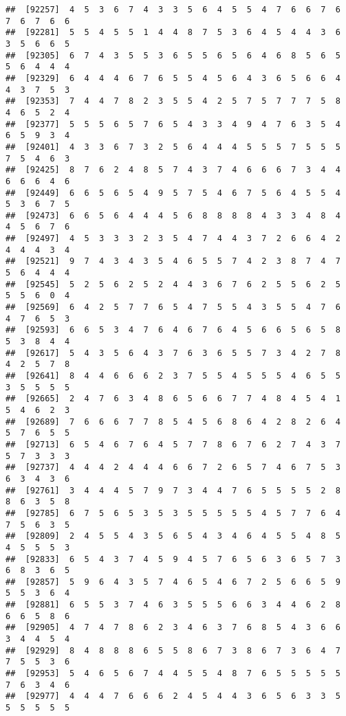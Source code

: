 \documentclass[
]{book}
\begin{document}
\begin{verbatim}
##  [92257]  4  5  3  6  7  4  3  3  5  6  4  5  5  4  7  6  6  7  6  7  6  7  6  6
##  [92281]  5  5  4  5  5  1  4  4  8  7  5  3  6  4  5  4  4  3  6  3  5  6  6  5
##  [92305]  6  7  4  3  5  5  3  6  5  5  6  5  6  4  6  8  5  6  5  5  6  4  4  4
##  [92329]  6  4  4  4  6  7  6  5  5  4  5  6  4  3  6  5  6  6  4  4  3  7  5  3
##  [92353]  7  4  4  7  8  2  3  5  5  4  2  5  7  5  7  7  7  5  8  4  6  5  2  4
##  [92377]  5  5  5  6  5  7  6  5  4  3  3  4  9  4  7  6  3  5  4  6  5  9  3  4
##  [92401]  4  3  3  6  7  3  2  5  6  4  4  4  5  5  5  7  5  5  5  7  5  4  6  3
##  [92425]  8  7  6  2  4  8  5  7  4  3  7  4  6  6  6  7  3  4  4  6  6  6  4  6
##  [92449]  6  6  5  6  5  4  9  5  7  5  4  6  7  5  6  4  5  5  4  5  3  6  7  5
##  [92473]  6  6  5  6  4  4  4  5  6  8  8  8  8  4  3  3  4  8  4  4  5  6  7  6
##  [92497]  4  5  3  3  3  2  3  5  4  7  4  4  3  7  2  6  6  4  2  4  4  4  3  4
##  [92521]  9  7  4  3  4  3  5  4  6  5  5  7  4  2  3  8  7  4  7  5  6  4  4  4
##  [92545]  5  2  5  6  2  5  2  4  4  3  6  7  6  2  5  5  6  2  5  5  5  6  0  4
##  [92569]  6  4  2  5  7  7  6  5  4  7  5  5  4  3  5  5  4  7  6  4  7  6  5  3
##  [92593]  6  6  5  3  4  7  6  4  6  7  6  4  5  6  6  5  6  5  8  5  3  8  4  4
##  [92617]  5  4  3  5  6  4  3  7  6  3  6  5  5  7  3  4  2  7  8  4  2  5  7  8
##  [92641]  8  4  4  6  6  6  2  3  7  5  5  4  5  5  5  4  6  5  5  3  5  5  5  5
##  [92665]  2  4  7  6  3  4  8  6  5  6  6  7  7  4  8  4  5  4  1  5  4  6  2  3
##  [92689]  7  6  6  6  7  7  8  5  4  5  6  8  6  4  2  8  2  6  4  5  7  6  5  5
##  [92713]  6  5  4  6  7  6  4  5  7  7  8  6  7  6  2  7  4  3  7  5  7  3  3  3
##  [92737]  4  4  4  2  4  4  4  6  6  7  2  6  5  7  4  6  7  5  3  6  3  4  3  6
##  [92761]  3  4  4  4  5  7  9  7  3  4  4  7  6  5  5  5  5  2  8  8  6  3  5  8
##  [92785]  6  7  5  6  5  3  5  3  5  5  5  5  5  4  5  7  7  6  4  7  5  6  3  5
##  [92809]  2  4  5  5  4  3  5  6  5  4  3  4  6  4  5  5  4  8  5  4  5  5  5  3
##  [92833]  6  5  4  3  7  4  5  9  4  5  7  6  5  6  3  6  5  7  3  6  8  3  6  5
##  [92857]  5  9  6  4  3  5  7  4  6  5  4  6  7  2  5  6  6  5  9  5  5  3  6  4
##  [92881]  6  5  5  3  7  4  6  3  5  5  5  6  6  3  4  4  6  2  8  6  6  5  8  6
##  [92905]  4  7  4  7  8  6  2  3  4  6  3  7  6  8  5  4  3  6  6  3  4  4  5  4
##  [92929]  8  4  8  8  8  6  5  5  8  6  7  3  8  6  7  3  6  4  7  7  5  5  3  6
##  [92953]  5  4  6  5  6  7  4  4  5  5  4  8  7  6  5  5  5  5  5  7  6  3  4  6
##  [92977]  4  4  4  7  6  6  6  2  4  5  4  4  3  6  5  6  3  3  5  5  5  5  5  5

\end{verbatim}
\end{document}
